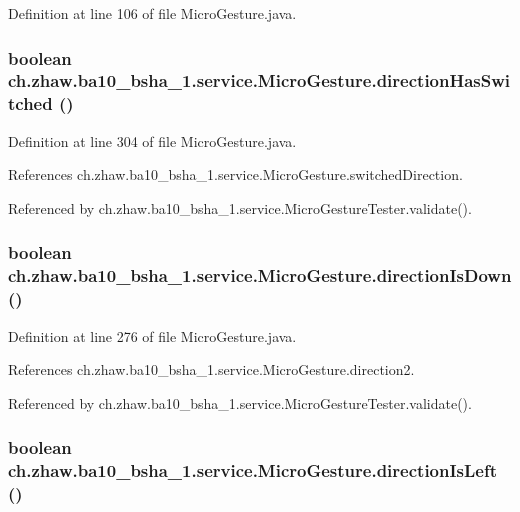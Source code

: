 Definition at line 106 of file MicroGesture.java.\hypertarget{classch_1_1zhaw_1_1ba10__bsha__1_1_1service_1_1MicroGesture_a6ac77efbcacfb83da624687c2362b2a9}{
\subsubsection[{directionHasSwitched}]{\setlength{\rightskip}{0pt plus 5cm}boolean ch.zhaw.ba10\_\-bsha\_\-1.service.MicroGesture.directionHasSwitched ()}}
\label{classch_1_1zhaw_1_1ba10__bsha__1_1_1service_1_1MicroGesture_a6ac77efbcacfb83da624687c2362b2a9}


Definition at line 304 of file MicroGesture.java.

References ch.zhaw.ba10\_\-bsha\_\-1.service.MicroGesture.switchedDirection.

Referenced by ch.zhaw.ba10\_\-bsha\_\-1.service.MicroGestureTester.validate().\hypertarget{classch_1_1zhaw_1_1ba10__bsha__1_1_1service_1_1MicroGesture_af20c9c32f3b4f9924bffffc78b7697e6}{
\subsubsection[{directionIsDown}]{\setlength{\rightskip}{0pt plus 5cm}boolean ch.zhaw.ba10\_\-bsha\_\-1.service.MicroGesture.directionIsDown ()}}
\label{classch_1_1zhaw_1_1ba10__bsha__1_1_1service_1_1MicroGesture_af20c9c32f3b4f9924bffffc78b7697e6}


Definition at line 276 of file MicroGesture.java.

References ch.zhaw.ba10\_\-bsha\_\-1.service.MicroGesture.direction2.

Referenced by ch.zhaw.ba10\_\-bsha\_\-1.service.MicroGestureTester.validate().\hypertarget{classch_1_1zhaw_1_1ba10__bsha__1_1_1service_1_1MicroGesture_a4d4320e029aef962577b2ccc85f2ee57}{
\subsubsection[{directionIsLeft}]{\setlength{\rightskip}{0pt plus 5cm}boolean ch.zhaw.ba10\_\-bsha\_\-1.service.MicroGesture.directionIsLeft ()}}
\label{classch_1_1zhaw_1_1ba10__bsha__1_1_1service_1_1MicroGesture_a4d4320e029aef962577b2ccc85f2ee57}


